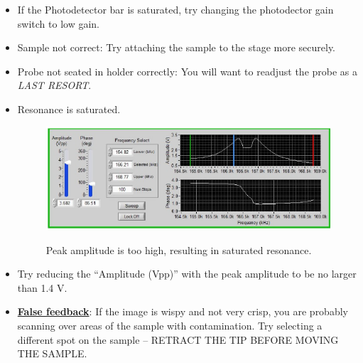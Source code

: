 \documentclass{../lab}
\begin{document}
\begin{itemize}
    \item If the Photodetector bar is saturated, try changing the photodector gain switch to low gain.

    \item Sample not correct: Try attaching the sample to the stage more securely.

    \item Probe not seated in holder correctly:  You will want to readjust the probe as a \emph{LAST RESORT}.
    
    \item Resonance is saturated.

    \begin{figure}[H]
        \centering
        \href{http://experimentationlab.berkeley.edu/sites/default/files/AFMImages/54.png}{\includegraphics[width=0.7\linewidth]{images/54.png}}
        \caption{Peak amplitude is too high, resulting in saturated resonance.}
    \end{figure}

    \item Try reducing the ``Amplitude (Vpp)'' with the peak amplitude to be no larger than 1.4 V.

    \item \href{http://experimentationlab.berkeley.edu/sites/default/files/AFMImages/VM\%204.2.\%20On\%20Cont-small\%20vib\_converted\_r1.mp4}{\textbf{False feedback}}:  If the image is wispy and not very crisp, you are probably scanning over areas of the sample with contamination.  Try selecting a different spot on the sample -- RETRACT THE TIP BEFORE MOVING THE SAMPLE.
\end{itemize}
\end{document}
